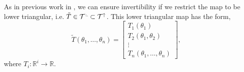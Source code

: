 \documentclass[final]{siamltex}
\newcommand{\ltri}{%
\,\resizebox{!}{0.25\baselineskip}{%
\begin{tikzpicture}%
\draw[line width=1mm](0,0) -- (0,2) -- (2,0)  -- (0,0);
\end{tikzpicture}%
}\xspace%
}%
\begin{document}

As in previous work in \cite{parno2014transport}, we can ensure
invertibility if we restrict the map to be lower triangular, i.e. $\tilde{T} \in \mathcal{T}^{\ltri}\subset\mathcal{T}^\uparrow$. This lower triangular map has the form,
\[
	\tilde{T}(\theta_1, \dots, \theta_n) = \begin{bmatrix} T_1(\theta_1) \\ T_2(\theta_1, \theta_2) \\ \vdots \\
		T_n(\theta_1, \dots, \theta_n) \end{bmatrix},
\]
where $T_i\colon \mathbb{R}^i \to \mathbb{R}$. %
\end{document}
